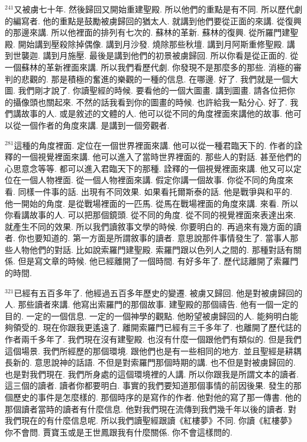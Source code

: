 \documentclass{book}
\begin{document}
$^{241}$又被虜七十年.
然後歸回又開始重建聖殿.
所以他們的重點是有不同.
所以歷代劇的編寫者.
他的重點是鼓勵被虜歸回的猶太人.
就講到他們要從正面的來講.
從復興的那邊來講.
所以他裡面的排列有七次的.
蘇林的革新.
蘇林的復興.
從所羅門建聖殿.
開始講到壓殺除掉偶像.
講到月沙發.
燒除那些秋壇.
講到月阿斯重修聖殿.
講到世襲迦.
講到月施壓.
最後是講到他們的初景被虜歸回.
所以你看是從正面的.
從一個蘇林的革新裡面來講.
所以我們看歷代劇.
你發現不是那麼多的那些.
消極的審判的悲觀的.
那是積極的奮進的樂觀的一種的信息.
在哪邊.
好了.
我們就是一個大圖.
我們剛才說了.
你讀聖經的時候.
要看他的一個大圖畫.
講到圖畫.
請各位把你的攝像頭也關起來.
不然的話我看到你的圖畫的時候.
也許給我一點分心.
好了.
我們講故事的人.
或是敘述的文體的人.
他可以從不同的角度裡面來講他的故事.
他可以從一個作者的角度來講.
是講到一個旁觀者.

$^{281}$這種的角度裡面.
定位在一個世界裡面來講.
他可以從一種君臨天下的.
作者的詮釋的一個視覺裡面來講.
他可以進入了當時世界裡面的.
那些人的對話.
甚至他們的心思意念等等.
都可以進入君臨天下的那種.
詮釋的一個視覺裡面來講.
他又可以定位在一個人物裡面.
從一個人物裡面來講.
假定你講一個故事.
你從不同的角度來看.
同樣一件事的話.
出現有不同效果.
如果看托爾斯泰的話.
他是戰爭與和平的.
他一開始的角度.
是從戰場裡面的一匹馬.
從馬在戰場裡面的角度來講.
來看.
所以你看講故事的人.
可以把那個鏡頭.
從不同的角度.
從不同的視覺裡面來表達出來.
就產生不同的效果.
所以我們讀敘事文學的時候.
你要明白的.
再過來有幾方面的讀者.
你也要知道的.
第一方面是所謂敘事的讀者.
意思說那件事情發生了.
當事人那些人物他們的對話.
比如說索羅門建聖殿.
索羅門跟以色列人之間的.
那種對話有關係.
但是寫文章的時候.
他已經離開了一個時間.
有好多年了.
歷代誌離開了索羅門的時間.

$^{321}$已經有五百多年了.
他經過五百多年歷史的變遷.
被虜又歸回.
他是對被虜歸回的人.
那些讀者來講.
他寫出索羅門的那個故事.
建聖殿的那個禱告.
他有一個一定的目的.
一定的一個信息.
一定的一個神學的觀點.
他盼望被虜歸回的人.
能夠明白能夠領受的.
現在你跟我更遙遠了.
離開索羅門已經有三千多年了.
也離開了歷代誌的作者兩千多年了.
我們現在沒有建聖殿.
也沒有什麼一個跟他們有類似的.
但是我們這個場景.
我們所經歷的那個環境.
跟他們也是有一些相同的地方.
並且聖經是耕耦長新的.
意思說神的話語.
不但是對索羅門那個時期的講.
也不但是對被虜歸回的.
也是對我們現在.
我們所身處的這個環境裡的人講.
所以你跟我是所謂文本的讀者.
這三個的讀者.
讀者你都要明白.
事實的我們要知道那個事情的前因後果.
發生的那個歷史的事件是怎麼樣的.
那個時序的是寫作的作者.
他對他的寫了那一傳書.
他的那個讀者當時的讀者有什麼信息.
他對我們現在流傳到我們幾千年以後的讀者.
對我們現在的有什麼信息呢.
所以我們讀聖經跟讀《紅樓夢》不同.
你讀《紅樓夢》你不會問.
賈寶玉或是王世鳳跟我有什麼關係.
你不會這樣問的.
\end{document}
